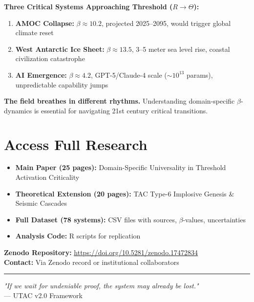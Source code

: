 \documentclass[11pt,a4paper]{article}
\begin{document}
\textbf{Three Critical Systems Approaching Threshold ($R \to \Theta$):}

\begin{enumerate}
\item \textbf{AMOC Collapse:} $\beta \approx 10.2$, projected 2025--2095, would trigger global climate reset
\item \textbf{West Antarctic Ice Sheet:} $\beta \approx 13.5$, 3--5 meter sea level rise, coastal civilization catastrophe
\item \textbf{AI Emergence:} $\beta \approx 4.2$, GPT-5/Claude-4 scale ($\sim 10^{13}$ params), unpredictable capability jumps
\end{enumerate}

\textbf{The field breathes in different rhythms.} Understanding domain-specific $\beta$-dynamics is essential for navigating 21st century critical transitions.

\section*{Access Full Research}

\begin{itemize}
\item \textbf{Main Paper (25 pages):} Domain-Specific Universality in Threshold Activation Criticality
\item \textbf{Theoretical Extension (20 pages):} TAC Type-6 Implosive Genesis \& Seismic Cascades
\item \textbf{Full Dataset (78 systems):} CSV files with sources, $\beta$-values, uncertainties
\item \textbf{Analysis Code:} R scripts for replication
\end{itemize}

\textbf{Zenodo Repository:} \url{https://doi.org/10.5281/zenodo.17472834}\\
\textbf{Contact:} Via Zenodo record or institutional collaborators

\vspace{1em}

\hrule

\vspace{0.5em}

\begin{center}
\textit{"If we wait for undeniable proof, the system may already be lost."} \\
— UTAC v2.0 Framework
\end{center}
\end{document}
